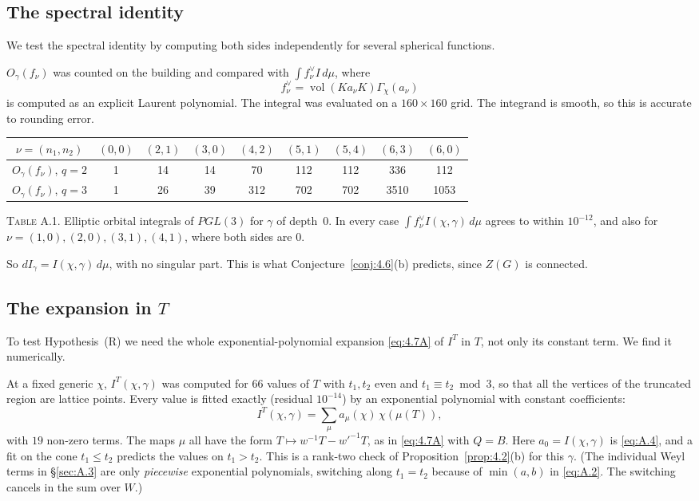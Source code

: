 \documentclass[12pt,letterpaper]{article}
\makeatletter
\numberwithin{equation}{section}
\theoremstyle{plain}
\theoremstyle{remark}
\theoremstyle{plain}
\theoremstyle{definition}
\theoremstyle{remark}
\newcommand{\fixedlabel}[1]{\phantomsection\def\@currentlabel{#1}}
\theoremstyle{remark}
\DeclareMathOperator{\vol}{vol}
\makeatother
\begin{document}
\subsection{The spectral identity}\label{sec:A.4}

We test the spectral identity by computing both sides independently for several spherical functions.


$O_\gamma(f_\nu)$ was counted on the building and compared with $\int f_\nu^\vee I\,d\mu$, where
\[
f_\nu^\vee=\vol(Ka_\nu K)\Gamma_\chi(a_\nu)
\]
is computed as an explicit Laurent polynomial. The integral was evaluated on a $160\times160$ grid. The integrand is smooth, so this is accurate to rounding error.

\begin{center}
\begin{tabular}{c|cccccccc}
\toprule
$\nu=(n_1,n_2)$ & $(0,0)$ & $(2,1)$ & $(3,0)$ & $(4,2)$ & $(5,1)$ & $(5,4)$ & $(6,3)$ & $(6,0)$\\
\midrule
$O_\gamma(f_\nu)$, $q=2$ & 1 & 14 & 14 & 70 & 112 & 112 & 336 & 112\\
$O_\gamma(f_\nu)$, $q=3$ & 1 & 26 & 39 & 312 & 702 & 702 & 3510 & 1053\\
\bottomrule
\end{tabular}

\smallskip
\fixedlabel{A.1}\label{tab:A.1}\textsc{Table A.1.} Elliptic orbital integrals of $PGL(3)$ for $\gamma$ of depth~$0$. In every case $\int f_\nu^\vee I(\chi,\gamma)\,d\mu$ agrees to within $10^{-12}$, and also for $\nu=(1,0),(2,0),(3,1),(4,1)$, where both sides are $0$.
\end{center}

So $dI_\gamma=I(\chi,\gamma)\,d\mu$, with no singular part. This is what Conjecture~\ref{conj:4.6}(b) predicts, since $Z(G)$ is connected.

\subsection{The expansion in \texorpdfstring{$T$}{T}}\label{sec:A.5}

To test Hypothesis~(R) we need the whole exponential-polynomial expansion \eqref{eq:4.7A} of $I^T$ in $T$, not only its constant term. We find it numerically.


At a fixed generic $\chi$, $I^T(\chi,\gamma)$ was computed for $66$ values of $T$ with $t_1,t_2$ even and $t_1\equiv t_2\bmod3$, so that all the vertices of the truncated region are lattice points. Every value is fitted exactly (residual $10^{-14}$) by an exponential polynomial with constant coefficients:
\[
I^T(\chi,\gamma)=\sum_{\mu}a_\mu(\chi)\,\chi(\mu(T)),
\]
with $19$ non-zero terms. The maps $\mu$ all have the form $T\mapsto w^{-1}T-w'^{-1}T$, as in \eqref{eq:4.7A} with $Q=B$. Here $a_0=I(\chi,\gamma)$ is \eqref{eq:A.4}, and a fit on the cone $t_1\le t_2$ predicts the values on $t_1>t_2$. This is a rank-two check of Proposition~\ref{prop:4.2}(b) for this $\gamma$. (The individual Weyl terms in \S\ref{sec:A.3} are only \emph{piecewise} exponential polynomials, switching along $t_1=t_2$ because of $\min(a,b)$ in \eqref{eq:A.2}. The switching cancels in the sum over $W$.)
\end{document}
